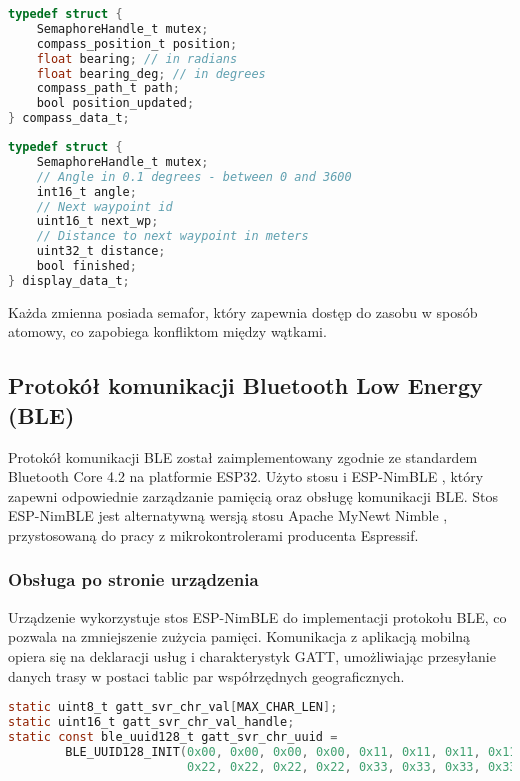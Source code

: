 \begin{lstlisting}[language=C, caption=Definicja zmiennej dla odczytów sensorów]
typedef struct {
    SemaphoreHandle_t mutex;
    compass_position_t position;
    float bearing; // in radians
    float bearing_deg; // in degrees
    compass_path_t path;
    bool position_updated;
} compass_data_t;
\end{lstlisting}

\begin{lstlisting}[language=C, caption=Definicja zmiennej dla danych wynikowych]
typedef struct {
    SemaphoreHandle_t mutex;
    // Angle in 0.1 degrees - between 0 and 3600
    int16_t angle;
    // Next waypoint id
    uint16_t next_wp;
    // Distance to next waypoint in meters
    uint32_t distance;
    bool finished;
} display_data_t;
\end{lstlisting}

Każda zmienna posiada semafor, który zapewnia dostęp do zasobu w sposób atomowy, co zapobiega konfliktom między wątkami.



\subsection{Protokół komunikacji Bluetooth Low Energy (BLE)}
Protokół komunikacji BLE został zaimplementowany zgodnie ze standardem Bluetooth Core 4.2 \cite{bluetooth-core-spec-4-2} na platformie ESP32.
Użyto stosu i ESP-NimBLE \cite{esp-idf-nimble-docs}, który zapewni odpowiednie zarządzanie pamięcią oraz obsługę komunikacji BLE.
Stos ESP-NimBLE jest alternatywną wersją stosu Apache MyNewt Nimble \cite{apache-mynewt-docs}, przystosowaną do pracy z mikrokontrolerami producenta Espressif.

\subsubsection{Obsługa po stronie urządzenia}
Urządzenie wykorzystuje stos ESP-NimBLE do implementacji protokołu BLE, co pozwala na zmniejszenie zużycia pamięci.
Komunikacja z aplikacją mobilną opiera się na deklaracji usług i charakterystyk GATT, umożliwiając przesyłanie danych trasy w postaci tablic par współrzędnych geograficznych.

\begin{lstlisting}[language=C, caption=Definicja charakterystyki GATT]
static uint8_t gatt_svr_chr_val[MAX_CHAR_LEN];
static uint16_t gatt_svr_chr_val_handle;
static const ble_uuid128_t gatt_svr_chr_uuid =
        BLE_UUID128_INIT(0x00, 0x00, 0x00, 0x00, 0x11, 0x11, 0x11, 0x11,
                         0x22, 0x22, 0x22, 0x22, 0x33, 0x33, 0x33, 0x33);
\end{lstlisting}


